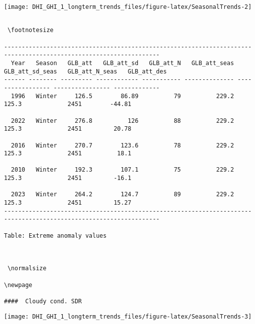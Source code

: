 \documentclass[
  10pt,
  a4paper,oneside]{article}
\begin{document}
\begin{center}\texttt{[image: DHI\_GHI\_1\_longterm\_trends\_files/figure-latex/SeasonalTrends-2]} \end{center}

\begin{verbatim}
 
 \footnotesize 
 
------------------------------------------------------------------------------------------------------------------
  Year   Season   GLB_att   GLB_att_sd   GLB_att_N   GLB_att_seas   GLB_att_sd_seas   GLB_att_N_seas   GLB_att_des
------ -------- --------- ------------ ----------- -------------- ----------------- ---------------- -------------
  1996   Winter     126.5        86.89          79          229.2             125.3             2451        -44.81

  2022   Winter     276.8          126          88          229.2             125.3             2451         20.78

  2016   Winter     270.7        123.6          78          229.2             125.3             2451          18.1

  2010   Winter     192.3        107.1          75          229.2             125.3             2451         -16.1

  2023   Winter     264.2        124.7          89          229.2             125.3             2451         15.27
------------------------------------------------------------------------------------------------------------------

Table: Extreme anomaly values


 
 \normalsize 
 
\newpage

####  Cloudy cond. SDR 
\end{verbatim}

\begin{center}\texttt{[image: DHI\_GHI\_1\_longterm\_trends\_files/figure-latex/SeasonalTrends-3]} \end{center}
\end{document}
